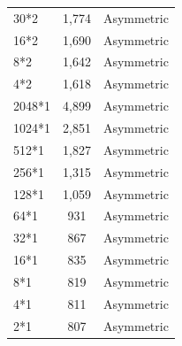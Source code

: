 \documentclass[conference]{IEEEtran}
\begin{document}
\begin{table}[ht]
\begin{tabular}{lcl}
30*2       & 1,774           & Asymmetric \\
16*2       & 1,690           & Asymmetric \\
8*2        & 1,642           & Asymmetric \\
4*2        & 1,618           & Asymmetric \\
2048*1     & 4,899           & Asymmetric \\
1024*1     & 2,851           & Asymmetric \\
512*1      & 1,827           & Asymmetric \\
256*1      & 1,315           & Asymmetric \\
128*1      & 1,059           & Asymmetric \\
64*1       & 931             & Asymmetric \\
32*1       & 867             & Asymmetric \\
16*1       & 835             & Asymmetric \\
8*1        & 819             & Asymmetric \\
4*1        & 811             & Asymmetric \\
2*1        & 807             & Asymmetric \\
\bottomrule
\end{tabular}
\end{table}
\end{document}

